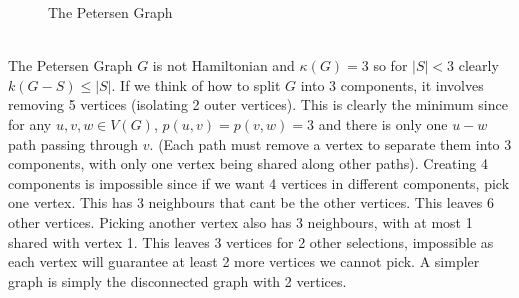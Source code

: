 \documentclass[letterpaper, 11pt]{article}
\newcommand{\1}{\mathds{1}}	%
\theoremstyle{definition}
\begin{document}
\begin{figure}[h]
\centering
{}
\caption{The Petersen Graph}
\label{fig:petersen}
\end{figure}
~\\
The Petersen Graph $G$ is not Hamiltonian and $\kappa (G) = 3$ so for $|S| < 3$ clearly $k(G-S) \le |S|$. If we think of how to split $G$ into 3 components, it involves removing 5 vertices (isolating 2 outer vertices). This is clearly the minimum since for any $u,v,w \in V(G)$, $p(u,v) = p(v,w) = 3$ and there is only one $u-w$ path passing through $v$. (Each path must remove a vertex to separate them into 3 components, with only one vertex being shared along other paths). Creating 4 components is impossible since if we want 4 vertices in different components, pick one vertex. This has 3 neighbours that cant be the other vertices. This leaves 6 other vertices. Picking another vertex also has 3 neighbours, with at most 1 shared with vertex 1. This leaves 3 vertices for 2 other selections, impossible as each vertex will guarantee at least 2 more vertices we cannot pick. A simpler graph is simply the disconnected graph with 2 vertices.
\end{document}
